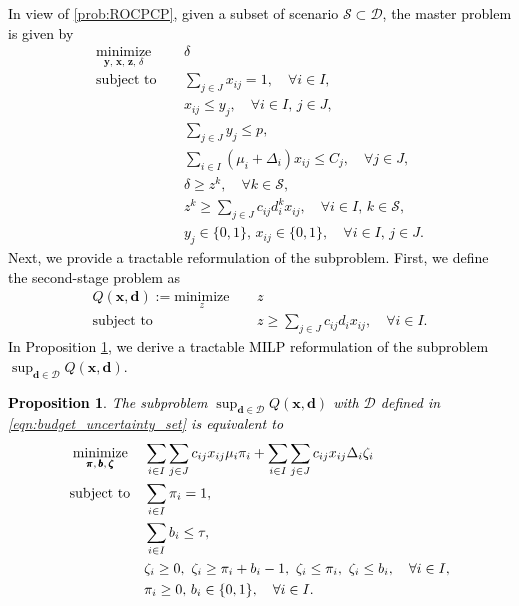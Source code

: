 \documentclass[preprint,review,11pt]{elsarticle}
\newtheorem{prop}[thm]{Proposition}
\theoremstyle{definition}
\theoremstyle{remark}
\newcommand{\calD}{\mathcal{D}}
\newcommand{\calS}{\mathcal{S}}
\newcommand{\xb}{\pmb{x}}
\newcommand{\yb}{\pmb{y}}
\newcommand{\db}{\pmb{d}}
\newcommand{\zb}{\pmb{z}}
\newcommand{\bb}{\pmb{b}}
\newcommand{\zetab}{\pmb{\zeta}}
\newcommand{\pib}{\pmb{\pi}}
\newcommand{\blue}{\textcolor{black}}
\begin{document}
\blue{
In view of \eqref{prob:ROCPCP}, given a subset of scenario $\calS\subset\calD$, the master problem is given by
%
\begin{subequations}
\begin{align}
\underset{\yb,\,\xb,\,\zb,\,\delta}{\text{minimize}}\, \quad
& \delta\\
\text{subject to} \quad\,
& \sum_{j\in J} x_{ij}=1,\quad\forall i\in I, \\
& x_{ij}\leq y_j,\quad\forall i\in I,\, j\in J, \\
& \sum_{j\in J} y_j \leq p, \\
& \sum_{i\in I} (\mu_i+\Delta_i) x_{ij} \leq C_j ,\quad\forall j\in J, \\
& \delta \geq z^k,\quad\forall k\in\calS, \\
& z^k \geq \sum_{j\in J} c_{ij}d_i^k x_{ij},\quad\forall i\in I,\,k\in\calS, \\
& y_j\in\{0,1\},\, x_{ij}\in\{0,1\},\quad\forall i\in I,\, j\in J.
\end{align}%
\end{subequations}
%
Next, we provide a tractable reformulation of the subproblem. First, we define the second-stage problem as 
%
\begin{subequations}
\begin{align}
Q(\xb,\db):=\underset{z}{\text{minimize}}\, \quad
& z\\
\text{subject to} \quad
& z \geq \sum_{j\in J} c_{ij} d_i x_{ij} ,\quad\forall i\in I.
\end{align} \label{prob:ROCPCP_SS}%
\end{subequations}
%
In Proposition \ref{prop:ROCPCP_inner_max_dual_reformulation}, we derive a tractable MILP reformulation of the subproblem $\sup_{\db\in\calD} Q(\xb,\db)$.
}

\blue{
\begin{prop} \label{prop:ROCPCP_inner_max_dual_reformulation}
The subproblem $\sup_{\db\in\calD} Q(\xb,\db)$ with $\calD$ defined in \eqref{eqn:budget_uncertainty_set} is equivalent to
%
\begin{subequations}
\begin{align}
\underset{\pib,\,\bb,\,\zetab}{\textup{minimize}}\, \quad
&  \sum_{i\in I}\sum_{j\in J} c_{ij}x_{ij}\mu_i\pi_i + \sum_{i\in I}\sum_{j\in J} c_{ij}x_{ij} \Delta_i\zeta_i \\
\textup{subject to} \quad
& \sum_{i\in I}\pi_i=1,\\
& \sum_{i\in I} b_i \leq \tau, \\
& \zeta_i\geq 0,\,\,\zeta_i\geq \pi_i +b_i-1,\,\,\zeta_i\leq \pi_i,\,\,\zeta_i\leq b_i,\quad\forall i\in I, \\
& \pi_i \geq 0,\, b_i\in\{0,1\},\quad\forall i\in I.
\end{align} \label{prob:ROCPCP_subproblem_MILP}%
\end{subequations}  \vspace{-10mm}
\end{prop}
}
\end{document}
